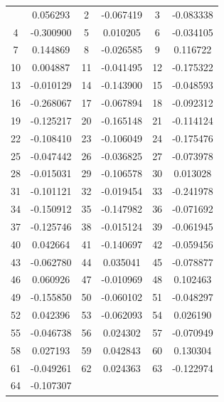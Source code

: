\documentclass[12pt]{article}
\begin{document}
\begin{longtable}{@{}cc|cc|cc@{}}
\bottomrule
\endlastfoot
1 & 0.056293 & 2 & -0.067419 & 3 & -0.083338 \\
4 & -0.300900 & 5 & 0.010205 & 6 & -0.034105 \\
7 & 0.144869 & 8 & -0.026585 & 9 & 0.116722 \\
10 & 0.004887 & 11 & -0.041495 & 12 & -0.175322 \\
13 & -0.010129 & 14 & -0.143900 & 15 & -0.048593 \\
16 & -0.268067 & 17 & -0.067894 & 18 & -0.092312 \\
19 & -0.125217 & 20 & -0.165148 & 21 & -0.114124 \\
22 & -0.108410 & 23 & -0.106049 & 24 & -0.175476 \\
25 & -0.047442 & 26 & -0.036825 & 27 & -0.073978 \\
28 & -0.015031 & 29 & -0.106578 & 30 & 0.013028 \\
31 & -0.101121 & 32 & -0.019454 & 33 & -0.241978 \\
34 & -0.150912 & 35 & -0.147982 & 36 & -0.071692 \\
37 & -0.125746 & 38 & -0.015124 & 39 & -0.061945 \\
40 & 0.042664 & 41 & -0.140697 & 42 & -0.059456 \\
43 & -0.062780 & 44 & 0.035041 & 45 & -0.078877 \\
46 & 0.060926 & 47 & -0.010969 & 48 & 0.102463 \\
49 & -0.155850 & 50 & -0.060102 & 51 & -0.048297 \\
52 & 0.042396 & 53 & -0.062093 & 54 & 0.026190 \\
55 & -0.046738 & 56 & 0.024302 & 57 & -0.070949 \\
58 & 0.027193 & 59 & 0.042843 & 60 & 0.130304 \\
61 & -0.049261 & 62 & 0.024363 & 63 & -0.122974 \\
64 & -0.107307 &  &  &  &  \\

\end{longtable}
\end{document}

